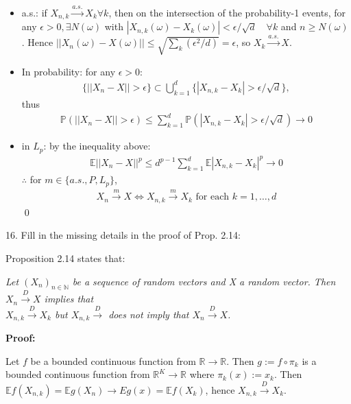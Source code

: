 \documentclass[10pt]{article}
\begin{document}
\begin{itemize}
    \item a.s.: if $X_{n, k} \xrightarrow{a.s.} X_k \forall k$, then on the intersection of the probability-1 events, for any $\epsilon > 0, \exists N(\omega)$ with $|X_{n, k}(\omega) - X_k(\omega)| < \epsilon/\sqrt{d}\quad\forall k$ and $n \ge N(\omega)$. Hence $||X_n(\omega) - X(\omega)|| \le \sqrt{\sum_k (\epsilon^2 / d)} = \epsilon$, so $X_k \xrightarrow{a.s.}X$.
    \item In probability: for any $\epsilon > 0$:
    \begin{gather*}
        \{||X_n - X|| > \epsilon\} \subset \bigcup_{k = 1}^{d}\{|X_{n, k} - X_k| > \epsilon / \sqrt{d}\},
    \end{gather*}
    thus 
    \begin{gather*}
        \mathbb{P}(||X_n - X|| > \epsilon) \le \sum_{k = 1}^{d}\mathbb{P}(|X_{n, k} - X_k| > \epsilon / \sqrt{d}) \to 0
    \end{gather*}
    \item in $L_p$: by the inequality above:
    \begin{gather*}
        \mathbb{E}||X_n - X||^p \le d^{p - 1}\sum_{k = 1}^{d}\mathbb{E}|X_{n, k} - X_k|^p \to 0
    \end{gather*}
    $\therefore$ for $m \in \{a.s., P, L_p\}$,
    \begin{gather*}
        X_n \xrightarrow{m} X \iff X_{n, k} \xrightarrow{m}X_k \text{ for each }k = 1, …, d
    \end{gather*}
    \qed
\end{itemize}

\newpage

16. Fill in the missing details in the proof of Prop. 2.14:

Proposition 2.14 states that:

\textit{Let $(X_n)_{n \in \mathbb{N}}$ be a sequence of random vectors and X a random vector. Then $X_n \xrightarrow{D}X$ implies that \\$X_{n, k} \xrightarrow{D}X_k$ but $X_{n, k} \xrightarrow{D}$ does not imply that $X_n \xrightarrow{D}X$.}

\textbf{Proof:}

Let $f$ be a bounded continuous function from $\mathbb{R} \to \mathbb{R}$. Then $g := f \circ \pi_k$ is a bounded continuous function from $\mathbb{R}^K \to \mathbb{R}$ where $\pi_k(x) := x_k$. Then $\mathbb{E}f(X_{n, k}) = \mathbb{E}g(X_n) \to Eg(x) = \mathbb{E}f(X_k)$, hence $X_{n, k} \xrightarrow{D}X_k$.
\end{document}
